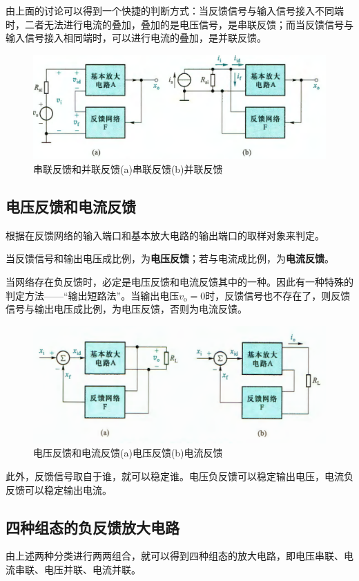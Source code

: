 由上面的讨论可以得到一个快捷的判断方式：当反馈信号与输入信号接入不同端时，二者无法进行电流的叠加，叠加的是电压信号，是串联反馈；而当反馈信号与输入信号接入相同端时，可以进行电流的叠加，是并联反馈。

\begin{figure}[htb]
    \centering
    \includegraphics[width=0.75\linewidth]{pic/串联反馈和并联反馈.png}
    \caption{串联反馈和并联反馈(a)串联反馈(b)并联反馈\cite{康华光}\label{串联反馈和并联反馈}}
\end{figure}

\subsection{电压反馈和电流反馈}
根据在反馈网络的输入端口和基本放大电路的输出端口的取样对象来判定。

当反馈信号和输出电压成比例，为\textbf{电压反馈}；若与电流成比例，为\textbf{电流反馈}。

当网络存在负反馈时，必定是电压反馈和电流反馈其中的一种。因此有一种特殊的判定方法——“输出短路法”。当输出电压$v_\mathrm{o}=0$时，反馈信号也不存在了，则反馈信号与输出电压成比例，为电压反馈，否则为电流反馈。

\begin{figure}[htb]
    \centering
    \includegraphics[width=0.75\linewidth]{pic/电压反馈和电流反馈.png}
    \caption{电压反馈和电流反馈(a)电压反馈(b)电流反馈\cite{康华光}\label{电压反馈和电流反馈}}
\end{figure}

此外，反馈信号取自于谁，就可以稳定谁。电压负反馈可以稳定输出电压，电流负反馈可以稳定输出电流。

\subsection{四种组态的负反馈放大电路}
由上述两种分类进行两两组合，就可以得到四种组态的放大电路，即电压串联、电流串联、电压并联、电流并联。

